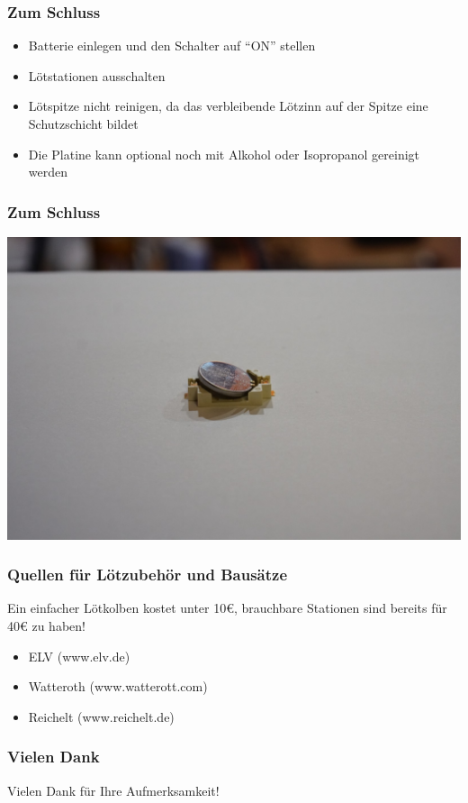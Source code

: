 \documentclass[10pt]{beamer}
\begin{document}
	\begin{frame}
	\frametitle{Zum Schluss}
	\begin{itemize} 
		\item{Batterie einlegen und den Schalter auf ``ON'' stellen}
		\item{Lötstationen ausschalten}
		\item{Lötspitze nicht reinigen, da das verbleibende Lötzinn auf der Spitze eine Schutzschicht bildet}
		\item{Die Platine kann optional noch mit Alkohol oder Isopropanol gereinigt werden}
	\end{itemize}
	\end{frame}

	\begin{frame}
		\frametitle{Zum Schluss}
		\includegraphics[width=\linewidth]{images/badge18/battHolderWithBattery.JPG}
	\end{frame}

	\begin{frame}
		\frametitle{Quellen für Lötzubehör und Bausätze}
		Ein einfacher Lötkolben kostet unter 10\euro{}, brauchbare Stationen sind bereits für 40\euro{} zu haben!
		
		\begin{itemize}
			\item{ELV (www.elv.de)}
			\item{Watteroth (www.watterott.com)}
			\item{Reichelt (www.reichelt.de)}
		\end{itemize}
	\end{frame}

	\begin{frame}
	\frametitle{Vielen Dank}
	\centering
	{\LARGE Vielen Dank für Ihre Aufmerksamkeit!}
	\end{frame}
    
\end{document}
